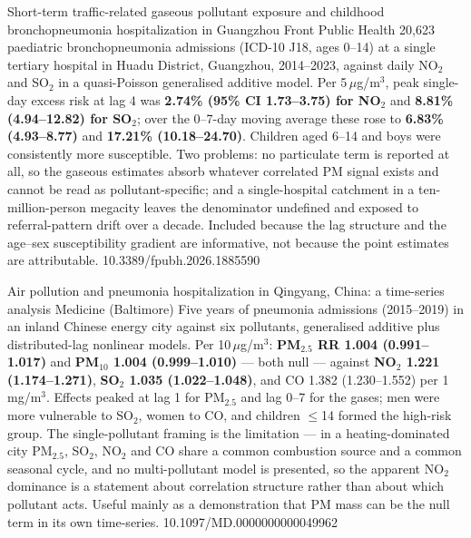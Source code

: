 \documentclass[10pt]{article}
\begin{document}

{Short-term traffic-related gaseous pollutant exposure and childhood bronchopneumonia
hospitalization in Guangzhou}
{Front Public Health}
{20,623 paediatric bronchopneumonia admissions (ICD-10 J18, ages 0--14) at a single
tertiary hospital in Huadu District, Guangzhou, 2014--2023, against daily NO$_2$ and
SO$_2$ in a quasi-Poisson generalised additive model. Per 5\,$\mu$g/m$^3$, peak
single-day excess risk at lag 4 was \textbf{2.74\% (95\% CI 1.73--3.75) for NO$_2$} and
\textbf{8.81\% (4.94--12.82) for SO$_2$}; over the 0--7-day moving average these rose to
\textbf{6.83\% (4.93--8.77)} and \textbf{17.21\% (10.18--24.70)}. Children aged 6--14 and
boys were consistently more susceptible. Two problems: no particulate term is reported at
all, so the gaseous estimates absorb whatever correlated PM signal exists and cannot be
read as pollutant-specific; and a single-hospital catchment in a ten-million-person
megacity leaves the denominator undefined and exposed to referral-pattern drift over a
decade. Included because the lag structure and the age--sex susceptibility gradient are
informative, not because the point estimates are attributable.}
{10.3389/fpubh.2026.1885590}

{Air pollution and pneumonia hospitalization in Qingyang, China: a time-series analysis}
{Medicine (Baltimore)}
{Five years of pneumonia admissions (2015--2019) in an inland Chinese energy city against
six pollutants, generalised additive plus distributed-lag nonlinear models. Per
10\,$\mu$g/m$^3$: \textbf{PM$_{2.5}$ RR 1.004 (0.991--1.017)} and \textbf{PM$_{10}$ 1.004
(0.999--1.010)} --- both null --- against \textbf{NO$_2$ 1.221 (1.174--1.271)},
\textbf{SO$_2$ 1.035 (1.022--1.048)}, and CO 1.382 (1.230--1.552) per 1\,mg/m$^3$.
Effects peaked at lag 1 for PM$_{2.5}$ and lag 0--7 for the gases; men were more
vulnerable to SO$_2$, women to CO, and children $\leq$14 formed the high-risk group. The
single-pollutant framing is the limitation --- in a heating-dominated city PM$_{2.5}$,
SO$_2$, NO$_2$ and CO share a common combustion source and a common seasonal cycle, and
no multi-pollutant model is presented, so the apparent NO$_2$ dominance is a statement
about correlation structure rather than about which pollutant acts. Useful mainly as a
demonstration that PM mass can be the null term in its own time-series.}
{10.1097/MD.0000000000049962}

\end{document}
